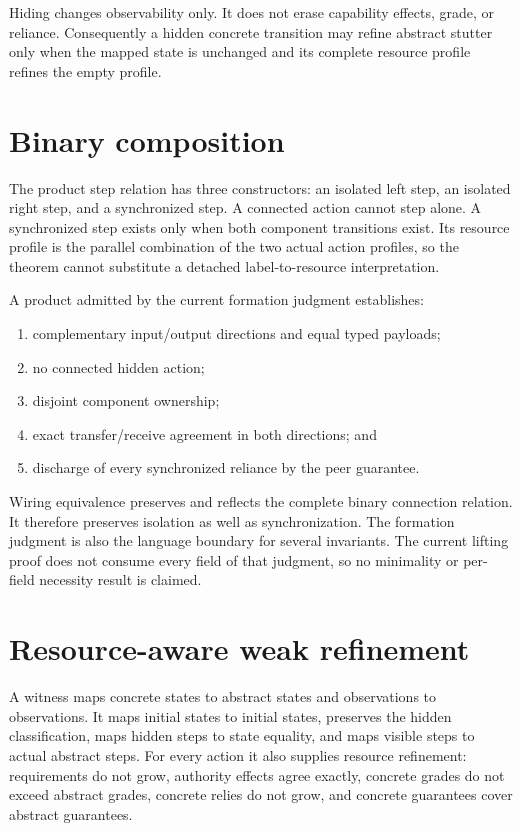 \documentclass[11pt]{article}
\begin{document}
Hiding changes observability only.  It does not erase capability effects,
grade, or reliance.  Consequently a hidden concrete transition may refine
abstract stutter only when the mapped state is unchanged and its complete
resource profile refines the empty profile.

\section{Binary composition}

The product step relation has three constructors: an isolated left step, an
isolated right step, and a synchronized step.  A connected action cannot step
alone.  A synchronized step exists only when both component transitions
exist.  Its resource profile is the parallel combination of the two actual
action profiles, so the theorem cannot substitute a detached
label-to-resource interpretation.

A product admitted by the current formation judgment establishes:
\begin{enumerate}
  \item complementary input/output directions and equal typed payloads;
  \item no connected hidden action;
  \item disjoint component ownership;
  \item exact transfer/receive agreement in both directions; and
  \item discharge of every synchronized reliance by the peer guarantee.
\end{enumerate}
Wiring equivalence preserves and reflects the complete binary connection
relation.  It therefore preserves isolation as well as synchronization.
The formation judgment is also the language boundary for several invariants.
The current lifting proof does not consume every field of that judgment, so no
minimality or per-field necessity result is claimed.

\section{Resource-aware weak refinement}

A witness maps concrete states to abstract states and observations to
observations.  It maps initial states to initial states, preserves the hidden
classification, maps hidden steps to state equality, and maps visible steps to
actual abstract steps.  For every action it also supplies resource refinement:
requirements do not grow, authority effects agree exactly, concrete grades do
not exceed abstract grades, concrete relies do not grow, and concrete
guarantees cover abstract guarantees.
\end{document}
